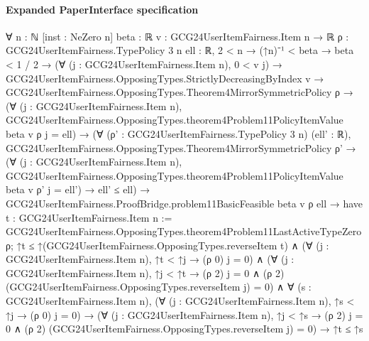 \documentclass[10pt]{article}
\begin{document}
\paragraph{Expanded PaperInterface specification}
\begin{ReviewVerbatim}
∀ {n : ℕ} [inst : NeZero n] {beta : ℝ} {v : GCG24UserItemFairness.Item n → ℝ} {ρ : GCG24UserItemFairness.TypePolicy 3 n}
  {ell : ℝ},
  2 < n →
    (↑n)⁻¹ < beta →
      beta < 1 / 2 →
        (∀ (j : GCG24UserItemFairness.Item n), 0 < v j) →
          GCG24UserItemFairness.OpposingTypes.StrictlyDecreasingByIndex v →
            GCG24UserItemFairness.OpposingTypes.Theorem4MirrorSymmetricPolicy ρ →
              (∀ (j : GCG24UserItemFairness.Item n),
                  GCG24UserItemFairness.OpposingTypes.theorem4Problem11PolicyItemValue beta v ρ j = ell) →
                (∀ (ρ' : GCG24UserItemFairness.TypePolicy 3 n) (ell' : ℝ),
                    GCG24UserItemFairness.OpposingTypes.Theorem4MirrorSymmetricPolicy ρ' →
                      (∀ (j : GCG24UserItemFairness.Item n),
                          GCG24UserItemFairness.OpposingTypes.theorem4Problem11PolicyItemValue beta v ρ' j = ell') →
                        ell' ≤ ell) →
                  GCG24UserItemFairness.ProofBridge.problem11BasicFeasible beta v ρ ell →
                    have t : GCG24UserItemFairness.Item n :=
                      GCG24UserItemFairness.OpposingTypes.theorem4Problem11LastActiveTypeZero ρ;
                    ↑t ≤ ↑(GCG24UserItemFairness.OpposingTypes.reverseItem t) ∧
                      (∀ (j : GCG24UserItemFairness.Item n), ↑t < ↑j → (ρ 0) j = 0) ∧
                        (∀ (j : GCG24UserItemFairness.Item n),
                            ↑j < ↑t → (ρ 2) j = 0 ∧ (ρ 2) (GCG24UserItemFairness.OpposingTypes.reverseItem j) = 0) ∧
                          ∀ (s : GCG24UserItemFairness.Item n),
                            (∀ (j : GCG24UserItemFairness.Item n), ↑s < ↑j → (ρ 0) j = 0) →
                              (∀ (j : GCG24UserItemFairness.Item n),
                                  ↑j < ↑s →
                                    (ρ 2) j = 0 ∧ (ρ 2) (GCG24UserItemFairness.OpposingTypes.reverseItem j) = 0) →
                                ↑t ≤ ↑s
\end{ReviewVerbatim}
\end{document}

